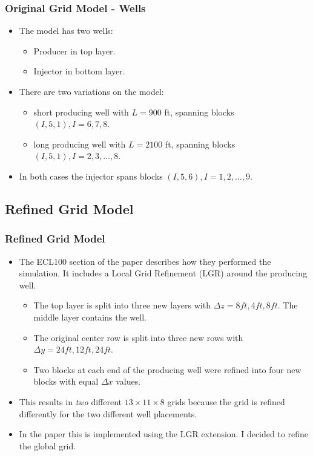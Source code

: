 \begin{frame}
    \frametitle{Original Grid Model - Wells}
    \begin{itemize}
        \item The model has two wells:
            \begin{itemize}
                \item Producer in top layer.
                \item Injector in bottom layer.
            \end{itemize}
        \item There are two variations on the model:
        \begin{itemize}
             \item short producing well with $L=900$ ft, spanning blocks $(I,5,1), I=6,7,8$.
             \item long producing well with $L=2100$ ft, spanning blocks $(I,5,1), I=2,3,\dots,8$.
        \end{itemize}
        \item In both cases the injector spans blocks $(I,5,6),I=1,2,\dots,9$.
    \end{itemize}
\end{frame}


\subsection{Refined Grid Model}
\begin{frame}
    \frametitle{Refined Grid Model}
    \begin{itemize}
        \item The ECL100 section of the paper describes how they performed the simulation. It includes a Local Grid Refinement (LGR) around the producing well.
        \begin{itemize}
            \item The top layer is split into three new layers with $\Delta z = 8ft, 4ft, 8ft$. The middle layer contains the well.
            \item The original center row is split into three new rows with $\Delta y = 24ft, 12ft, 24ft$.
            \item Two blocks at each end of the producing well were refined into four new blocks with equal $\Delta x$ values.
        \end{itemize}
        \item This results in \emph{two} different $13 \times 11 \times 8$ grids because the grid is refined differently for the two different well placements.
        \item In the paper this is implemented using the LGR extension. I decided to refine the global grid.
    \end{itemize}
\end{frame}


